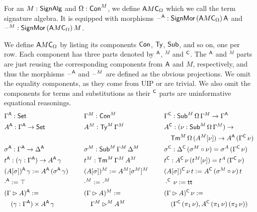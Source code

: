 \documentclass[a4paper,UKenglish,cleveref, autoref]{lipics-v2019}
\begin{document}


\begin{definition}
  For an $M:\mathsf{SignAlg}$ and $\Omega:\mathsf{Con}^M$, we define ${\mathsf{A} M\mathsf{C}}_\Omega$
  which we call the term signature algebra. It is equipped with
  morphisms $\mathord{\hspace{1pt}\text{--}\hspace{1pt}}^{\mathsf{A}} : \mathsf{SignMor}\,({\mathsf{A} M\mathsf{C}}_\Omega)\,\mathsf{A}$ and
  $\mathord{\hspace{1pt}\text{--}\hspace{1pt}}^M : \mathsf{SignMor}\,({\mathsf{A} M\mathsf{C}}_\Omega)\,M$.

  We define ${\mathsf{A} M\mathsf{C}}_\Omega$ by listing its components $\mathsf{Con}$, $\mathsf{Ty}$,
  $\mathsf{Sub}$, and so on, one per row. Each component has three parts
  denoted by $^{\mathsf{A}}$, $^M$ and $^{\mathsf{C}}$. The $^{\mathsf{A}}$ and $^M$ parts are just
  reusing the corresponding components from $\mathsf{A}$ and $M$,
  respectively, and thus the morphisms $\mathord{\hspace{1pt}\text{--}\hspace{1pt}}^{\mathsf{A}}$ and $\mathord{\hspace{1pt}\text{--}\hspace{1pt}}^M$ are
  defined as the obvious projections. We omit the equality components,
  as they come from UIP or are trivial. We also omit the components
  for terms and substitutions as their $^{\mathsf{C}}$ parts are uninformative
  equational reasonings.
  \begin{alignat*}{10}
    & \Gamma^\A:\Set && \hspace{0.4em} && \Gamma^M:\Con^M && \hspace{0.4em} && \Gamma^\C: \Sub^M\,\Omega\,\Gamma^M\ra \Gamma^\A \\
    & A^\A:\Gamma^\A\ra\Set && && A^M:\Ty^M\,\Gamma^M && && A^\C:(\nu:\Sub^M\,\Omega\,\Gamma^M)\ra \\
    & && && && && \hspace{1em} \Tm^M\,\Omega\,(A^M[\nu])\ra A^\A\,(\Gamma^\C\,\nu) \\
    & \sigma^\A:\Gamma^\A\ra\Delta^\A && && \sigma^M:\Sub^M\,\Gamma^M\,\Delta^M && && \sigma^\C:\Delta^\C\,(\sigma^M\circ\nu)=\sigma^A\,(\Gamma^\C\,\nu) \\
    & t^\A:(\gamma:\Gamma^\A)\ra A^\A\,\gamma && && t^M:\Tm^M\,\Gamma^M\,A^M && && t^\C : A^\C\,\nu\,(t^M[\nu])= t^A\,(\Gamma^\C\,\nu) \\
    & (A[\sigma])^\A\,\gamma := A^\A\,(\sigma^\A\,\gamma) && && (A[\sigma])^M := A^M[\sigma^M]^M && && (A[\sigma])^\C\,\nu\,t := A^\C\,(\sigma^M\circ\nu)\,t \\
    & \cdot^\A := \top && && \cdot^M := \cdot^M && && \cdot^\C\,\nu := \tt \\
    & (\Gamma\rhd A)^\A := && && (\Gamma\rhd A)^M :=  && && (\Gamma\rhd A)^\C\,\nu := \\
    & \hspace{1em} (\gamma:\Gamma^\A)\times A^\A\,\gamma && && \hspace{1em} \Gamma^M\rhd^M A^M && && \hspace{1em} (\Gamma^\C\,(\pi_1\,\nu), A^\C\,(\pi_1\,\nu)\,(\pi_2\,\nu)) \\

\end{alignat*}
\end{definition}
\end{document}
